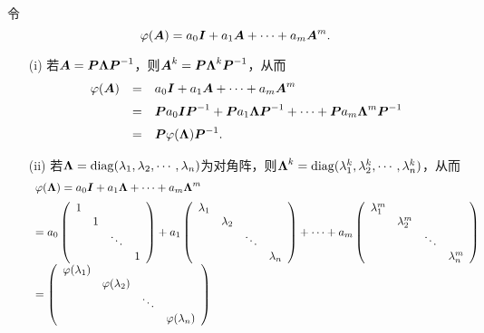 \begin{jielun}
  令
  $$
  \varphi(\boldsymbol{A}) = a_0 \boldsymbol{I} + a_1 \boldsymbol{A} + \cdots + a_m \boldsymbol{A}^m.
  $$
  \begin{itemize}
  \item[(i)]
    若$\boldsymbol{A} = \boldsymbol{P} \boldsymbol{\Lambda} \boldsymbol{P}^{-1}$，则$\boldsymbol{A}^k = \boldsymbol{P} \boldsymbol{\Lambda}^k \boldsymbol{P}^{-1}$，从而
    $$
    \begin{array}{rcl}
      \varphi(\boldsymbol{A}) &=& a_0 \boldsymbol{I} + a_1 \boldsymbol{A} + \cdots + a_m \boldsymbol{A}^m \\[0.2cm]
                  &=& \boldsymbol{P} a_0 \boldsymbol{I} \boldsymbol{P}^{-1} + \boldsymbol{P} a_1 \boldsymbol{\Lambda}\boldsymbol{P}^{-1} + \cdots + \boldsymbol{P} a_m \boldsymbol{\Lambda}^m \boldsymbol{P}^{-1} \\[0.2cm]
                  &=& \boldsymbol{P} \varphi(\boldsymbol{\Lambda}) \boldsymbol{P}^{-1}.
    \end{array}
    $$
  \item[(ii)] 若$\boldsymbol{\Lambda}=\mathrm{diag}(\lambda_1,\lambda_2,\cdots,\lambda_n)$为对角阵，则$\boldsymbol{\Lambda}^k=\mathrm{diag}(\lambda_1^k,\lambda_2^k,\cdots,\lambda_n^k)$，从而
    $$
    \begin{array}{l}
      \varphi(\boldsymbol{\Lambda}) = a_0 \boldsymbol{I} + a_1 \boldsymbol{\Lambda} + \cdots + a_m \boldsymbol{\Lambda}^m \\[0.2cm]
      =  a_0 \left(
      \begin{array}{cccc}
        1 & & &\\
          & 1 & & \\
          & & \ddots & \\
          & & & 1
      \end{array}
                \right)
                + a_1 \left(
                \begin{array}{cccc}
                  \lambda_1 & & &\\
                            & \lambda_2 & & \\
                            & & \ddots & \\
                            & & & \lambda_n
                \end{array}
                                  \right) + \cdots +  a_m \left(
                                  \begin{array}{cccc}
                                    \lambda_1^m & & &\\
                                                & \lambda_2^m & & \\
                                                & & \ddots & \\
                                                & & & \lambda_n^m
                                  \end{array}
                                                      \right)  \\[0.6cm]
      =\left(
      \begin{array}{cccc}
        \varphi(\lambda_1) & & &\\
                           & \varphi(\lambda_2) & & \\
                           & & \ddots & \\
                           & & & \varphi(\lambda_n)
      \end{array}
                                 \right)
    \end{array}
    $$
  \end{itemize}


\end{jielun}



% 


